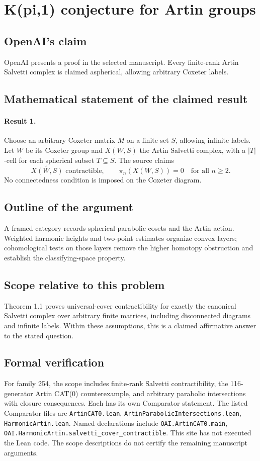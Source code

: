 \documentclass[11pt]{article}
\begin{document}
\section*{K(pi,1) conjecture for Artin groups}

\subsection{OpenAI's claim}
OpenAI presents a proof in the selected manuscript. Every finite-rank Artin Salvetti complex is claimed aspherical, allowing arbitrary Coxeter labels.

\subsection{Mathematical statement of the claimed result}
\paragraph{Result 1.} Choose an arbitrary Coxeter matrix \(M\) on a finite set \(S\), allowing infinite labels. Let \(W\) be its Coxeter group and \(X(W,S)\) the Artin Salvetti complex, with a \(|T|\)-cell for each spherical subset \(T\subseteq S\). The source claims
\[
 \widetilde{X(W,S)}\text{ contractible},\qquad
 \pi_n(X(W,S))=0\quad\text{for all }n\ge2.
\]
No connectedness condition is imposed on the Coxeter diagram.

\subsection{Outline of the argument}
A framed category records spherical parabolic cosets and the Artin action. Weighted harmonic heights and two-point estimates organize convex layers; cohomological tests on those layers remove the higher homotopy obstruction and establish the classifying-space property.

\subsection{Scope relative to this problem}
Theorem 1.1 proves universal-cover contractibility for exactly the canonical Salvetti complex over arbitrary finite matrices, including disconnected diagrams and infinite labels. Within these assumptions, this is a claimed affirmative answer to the stated question.

\subsection{Formal verification}
For family 254, the scope includes finite-rank Salvetti contractibility, the 116-generator Artin CAT(0) counterexample, and arbitrary parabolic intersections with closure consequences. Each has its own Comparator statement. The listed Comparator files are \texttt{ArtinCAT0.lean}, \texttt{ArtinParabolicIntersections.lean}, \texttt{HarmonicArtin.lean}. Named declarations include \texttt{OAI.ArtinCAT0.main}, \texttt{OAI.HarmonicArtin.salvetti\_cover\_contractible}. This site has not executed the Lean code. The scope descriptions do not certify the remaining manuscript arguments.
\end{document}
